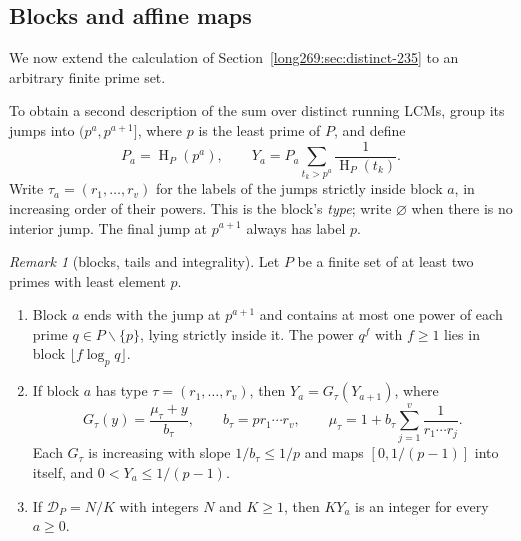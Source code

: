 \documentclass[11pt]{article}
\theoremstyle{remark}
\newtheorem{recordremark}[theorem]{Remark}
\renewenvironment{remark}[1][]{\begin{recordremark}[#1]}{\end{recordremark}}
\theoremstyle{plain}
\newcommand{\hgt}{\operatorname{H}}
\begin{document}
\subsection{Blocks and affine maps}\label{long269:sec:distinct-blocks}
We now extend the calculation of Section~\ref{long269:sec:distinct-235}
to an arbitrary finite prime set.

To obtain a second description of the sum over distinct running LCMs, group its jumps
into $(p^a,p^{a+1}]$, where $p$ is the least prime of $P$, and define
\[
 P_a=\hgt_P(p^a),\qquad
 Y_a=P_a\sum_{t_k>p^a}\frac1{\hgt_P(t_k)}.
\]
Write $\tau_a=(r_1,\ldots,r_v)$ for the labels of the jumps strictly
inside block $a$, in increasing order of their powers. This is the block's
\emph{type}; write $\varnothing$ when there is no interior jump.
The final jump at $p^{a+1}$ always has label $p$.

\begin{remark}[blocks, tails and integrality]\label{long269:res:distinct-height-blocks}
Let $P$ be a finite set of at least two primes with least element $p$.
\begin{enumerate}[label=\textup{(\roman*)}]
\item Block $a$ ends with the jump at $p^{a+1}$ and contains at most one
power of each prime $q\in P\smallsetminus\{p\}$, lying strictly inside it.  The
power $q^f$ with $f\ge1$ lies in block $\lfloor f\log_pq\rfloor$.
\item If block $a$ has type $\tau=(r_1,\ldots,r_v)$, then
$Y_a=G_\tau(Y_{a+1})$, where
\[
 G_\tau(y)=\frac{\mu_\tau+y}{b_\tau},\qquad b_\tau=pr_1\cdots r_v,\qquad
 \mu_\tau=1+b_\tau\sum_{j=1}^{v}\frac1{r_1\cdots r_j}.
\]
Each $G_\tau$ is increasing with slope $1/b_\tau\le1/p$ and maps
$[0,1/(p-1)]$ into itself, and $0<Y_a\le1/(p-1)$.
\item If $\mathcal D_P=N/K$ with integers $N$ and $K\ge1$, then $KY_a$ is
an integer for every $a\ge0$.
\end{enumerate}
\end{remark}
\end{document}
